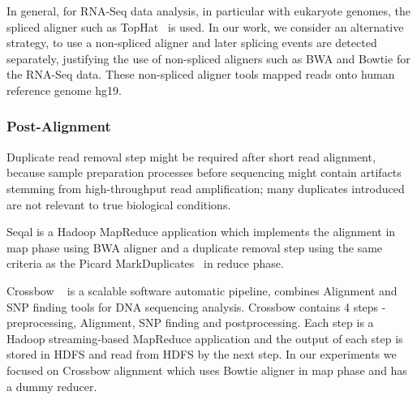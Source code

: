 \documentclass{acm_proc_article-sp}
\begin{document}
In general, for RNA-Seq data analysis, in particular with eukaryote
genomes, the spliced aligner such as TopHat~\cite{pepke2009} is
used. In our work, we consider an alternative strategy, to use a
non-spliced aligner and later splicing events are detected separately,
justifying the use of non-spliced aligners such as BWA and Bowtie for
the RNA-Seq data.  These non-spliced aligner tools mapped reads onto human reference genome hg19.

\subsubsection{Post-Alignment}
Duplicate read removal step might be required after short read
alignment, because sample preparation processes before sequencing
might contain artifacts stemming from high-throughput read
amplification; many duplicates introduced are not relevant to true
biological conditions. 

Seqal is a Hadoop MapReduce application which implements the alignment
in map phase using BWA aligner and a duplicate removal step using the same criteria as the Picard
MarkDuplicates~\cite{seal2011,seal_2011_mapred} in reduce phase. 

Crossbow ~\cite{langmead2009} is a scalable software automatic pipeline, combines Alignment and SNP finding tools for DNA sequencing analysis.
Crossbow contains 4 steps - preprocessing, Alignment, SNP finding and postprocessing.  Each step is a Hadoop streaming-based MapReduce application and the output of each step is stored in HDFS and read from HDFS by the next step.  In our experiments we focused on Crossbow alignment which uses Bowtie aligner in map phase and has a dummy reducer.  
\end{document}
